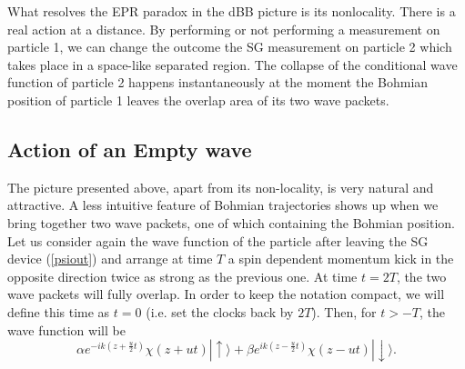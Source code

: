 \documentclass[preprint,tightenlines]{elsarticle}
\begin{document}
What resolves the EPR paradox in the dBB picture is its nonlocality.
There is a real action at a distance. By performing or not performing
a measurement on particle 1, we can change the outcome the SG
measurement on particle 2 which takes place in a space-like separated
region. The collapse of the conditional wave function of
particle 2 happens instantaneously at the moment the Bohmian position
of particle 1 leaves the overlap area of its two wave packets.


\subsection{ Action of an Empty wave}

The picture presented above, apart from its non-locality, is very
natural and attractive. A less intuitive feature of Bohmian trajectories
shows up when we bring together two wave packets, one of which containing the
Bohmian position. Let us consider again the
wave function of the particle after leaving the SG device
(\ref{psiout}) and arrange at time $T$ a spin dependent momentum
kick in the opposite direction twice as strong as the previous
one. At time $t=2T$, the two wave packets will fully overlap. In
order to keep the notation compact, we will define this time as $t=0$
(i.e. set the clocks back by $2T$). Then, for $t>-T$, the wave function
will be
\begin{equation}
\alpha e^{-ik(z+\frac{u}{2}t)}\chi(z+ut)|{\uparrow}\rangle+\beta e^{ik(z-\frac{u}{2}t)}\chi(z-ut)|{\downarrow}\rangle.\label{psioutnox1}
\end{equation}
\end{document}
